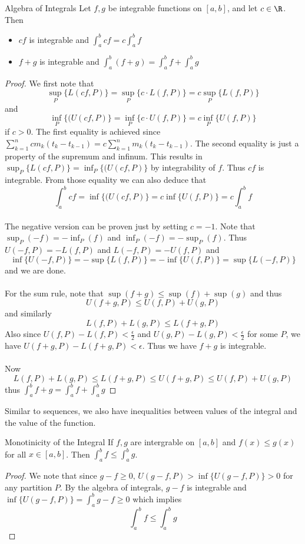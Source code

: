 \begin{thm}{Algebra of Integrals}{} Let $f,g$ be integrable functions on $[a,b]$, and let $c\in\R$. Then
\begin{itemize}
\item $cf$ is integrable and $\int_{a}^{b}cf=c\int_{a}^{b}f$
\item $f+g$ is integrable and $\int_{a}^{b}(f+g)=\int_{a}^{b}f+\int_{a}^{b}g$
\end{itemize}\tcbline
\begin{proof} We first note that $$\sup_P\{L(cf,P)\}=\sup_P\{c\cdot L(f,P)\}=c\sup_P\{L(f,P)\}$$ and $$\inf_P\{(U(cf,P)\}=\inf_P\{c\cdot U(f,P)\}=c\inf_P\{U(f,P)\}$$ if $c>0$. The first equality is achieved since $\sum_{k=1}^ncm_k(t_k-t_{k-1})=c\sum_{k=1}^nm_k(t_k-t_{k-1})$. The second equality is just a property of the supremum and infinum. This results in $\sup_P\{L(cf,P)\}=\inf_P\{(U(cf,P)\}$ by integrability of $f$. Thus $cf$ is integrable. From those equality we can also deduce that $$\int_a^bcf=\inf\{(U(cf,P)\}=c\inf\{U(f,P)\}=c\int_a^bf$$
\\
The negative version can be proven just by setting $c=-1$. Note that $\sup_P(-f)=-\inf_P(f)$ and $\inf_P(-f)=-\sup_P(f)$. Thus $U(-f,P)=-L(f,P)$ and $L(-f,P)=-U(f,P)$ and $$\inf\{U(-f,P)\}=-\sup\{L(f,P)\}=-\inf\{U(f,P)\}=\sup\{L(-f,P)\}$$ and we are done. \\~\\
For the sum rule, note that $\sup(f+g)\leq\sup(f)+\sup(g)$ and thus $$U(f+g,P)\leq U(f,P)+U(g,P)$$ and similarly $$L(f,P)+L(g,P)\leq L(f+g,P)$$ Also since $U(f,P)-L(f,P)<\frac{\epsilon}{2}$ and $U(g,P)-L(g,P)<\frac{\epsilon}{2}$ for some $P$, we have $U(f+g,P)-L(f+g,P)<\epsilon$. Thus we have $f+g$ is integrable. \\~\\
Now $$L(f,P)+L(g,P)\leq L(f+g,P)\leq U(f+g,P)\leq U(f,P)+U(g,P)$$ thus $\int_a^bf+g=\int_a^bf+\int_a^bg$
\end{proof}
\end{thm}

Similar to sequences, we also have inequalities between values of the integral and the value of the function. 

\begin{thm}{Monotinicity of the Integral}{} If $f,g$ are intergrable on $[a,b]$ and $f(x)\leq g(x)$ for all $x\in[a,b]$. Then $\int_{a}^{b}f\leq\int_{a}^{b}g$. \tcbline
\begin{proof} We note that since $g-f\geq 0$, $U(g-f,P)>\inf\{U(g-f,P)\}>0$ for any partition $P$. By the algebra of integrals, $g-f$ is integrable and $\inf\{U(g-f,P)\}=\int_a^bg-f\geq 0$ which implies $$\int_a^bf\leq\int_a^bg$$
\end{proof}
\end{thm}

